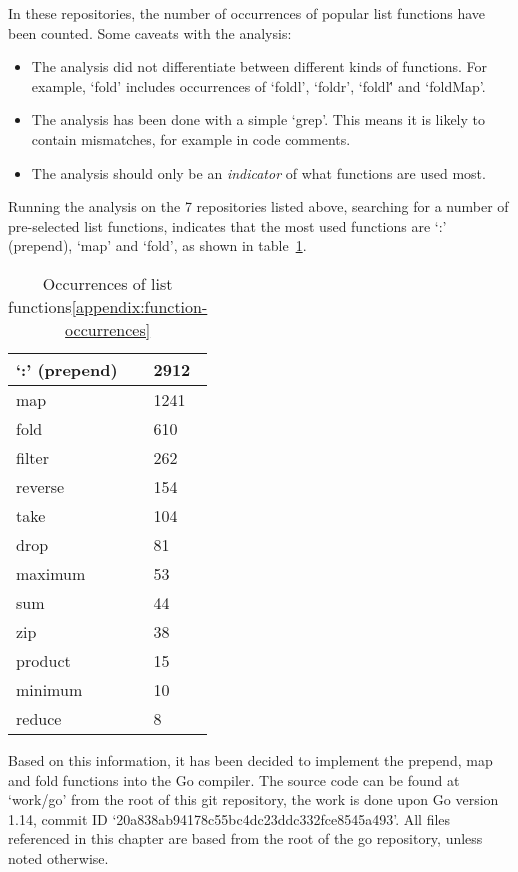 In these repositories, the number of occurrences of popular list functions have been counted. Some caveats with
the analysis:

\begin{itemize}
    \item The analysis did not differentiate between different kinds of functions. For example, `fold' includes
    occurrences of `foldl', `foldr', `foldl\'' and `foldMap'.
    \item The analysis has been done with a simple `grep'. This means it is likely to contain mismatches, for example
    in code comments.
    \item The analysis should only be an \textit{indicator} of what functions are used most.
\end{itemize}

Running the analysis on the 7 repositories listed above, searching for a number of pre-selected list functions, indicates
that the most used functions are `:' (prepend), `map' and `fold', as shown in table~\ref{tab:occurrences-list-funcs}.

\begin{table}[htb]
\centering
\caption{Occurrences of list functions\ref{appendix:function-occurrences}}\label{tab:occurrences-list-funcs}
\begin{tabular}{ll}
\toprule
`:' (prepend) & 2912 \\
\midrule
map & 1241 \\
\midrule
fold & 610 \\
\midrule
filter & 262 \\
\midrule
reverse & 154 \\
\midrule
take & 104 \\
\midrule
drop & 81 \\
\midrule
maximum & 53 \\
\midrule
sum & 44 \\
\midrule
zip & 38 \\
\midrule
product & 15 \\
\midrule
minimum & 10 \\
\midrule
reduce & 8
\end{tabular}
\end{table}

Based on this information, it has been decided to implement the prepend, map and fold functions into the
Go compiler.
The source code can be found at `work/go' from the root of this git repository\cite{git-repo}, the work
is done upon Go version 1.14, commit ID `20a838ab94178c55bc4dc23ddc332fce8545a493'.
All files referenced in this chapter are based from the root of the go repository, unless noted otherwise.

